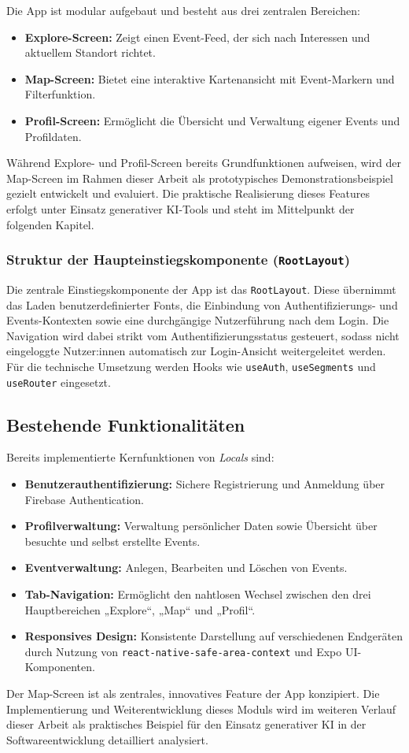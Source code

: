 Die App ist modular aufgebaut und besteht aus drei zentralen Bereichen:
\begin{itemize}
    \item \textbf{Explore-Screen:} Zeigt einen Event-Feed, der sich nach Interessen und aktuellem Standort richtet.
    \item \textbf{Map-Screen:} Bietet eine interaktive Kartenansicht mit Event-Markern und Filterfunktion.
    \item \textbf{Profil-Screen:} Ermöglicht die Übersicht und Verwaltung eigener Events und Profildaten.
\end{itemize}

Während Explore- und Profil-Screen bereits Grundfunktionen aufweisen, wird der
Map-Screen im Rahmen dieser Arbeit als prototypisches Demonstrationsbeispiel
gezielt entwickelt und evaluiert. Die praktische Realisierung dieses Features
erfolgt unter Einsatz generativer KI-Tools und steht im Mittelpunkt der
folgenden Kapitel.

\subsubsection{Struktur der Haupteinstiegskomponente (\texttt{RootLayout})}

Die zentrale Einstiegskomponente der App ist das \texttt{RootLayout}. Diese
übernimmt das Laden benutzerdefinierter Fonts, die Einbindung von
Authentifizierungs- und Events-Kontexten sowie eine durchgängige Nutzerführung
nach dem Login. Die Navigation wird dabei strikt vom Authentifizierungsstatus
gesteuert, sodass nicht eingeloggte Nutzer:innen automatisch zur Login-Ansicht
weitergeleitet werden. Für die technische Umsetzung werden Hooks wie
\texttt{useAuth}, \texttt{useSegments} und \texttt{useRouter} eingesetzt.

\subsection{Bestehende Funktionalitäten}

Bereits implementierte Kernfunktionen von \textit{Locals} sind:
\begin{itemize}
    \item \textbf{Benutzerauthentifizierung:} Sichere Registrierung und Anmeldung über Firebase Authentication.
    \item \textbf{Profilverwaltung:} Verwaltung persönlicher Daten sowie Übersicht über besuchte und selbst erstellte Events.
    \item \textbf{Eventverwaltung:} Anlegen, Bearbeiten und Löschen von Events.
    \item \textbf{Tab-Navigation:} Ermöglicht den nahtlosen Wechsel zwischen den drei Hauptbereichen „Explore“, „Map“ und „Profil“.
    \item \textbf{Responsives Design:} Konsistente Darstellung auf verschiedenen Endgeräten durch Nutzung von \texttt{react-native-safe-area-context} und Expo UI-Komponenten.
\end{itemize}

Der Map-Screen ist als zentrales, innovatives Feature der App konzipiert. Die
Implementierung und Weiterentwicklung dieses Moduls wird im weiteren Verlauf
dieser Arbeit als praktisches Beispiel für den Einsatz generativer KI in der
Softwareentwicklung detailliert analysiert.
